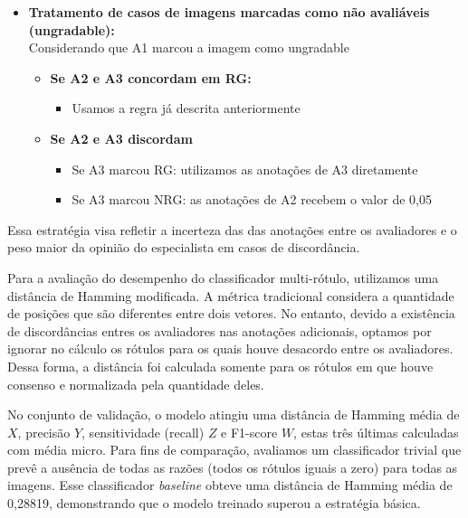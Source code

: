 \documentclass[12pt]{article}
\begin{document}
\begin{itemize}[noitemsep]
    \item \textbf{Tratamento de casos de imagens marcadas como não avaliáveis (ungradable):}\\
    Considerando que A1 marcou a imagem como ungradable
    \begin{itemize}[noitemsep]
        \item \textbf{Se A2 e A3 concordam em RG:}
        \begin{itemize}[noitemsep]
            \item Usamos a regra já descrita anteriormente
        \end{itemize}
        
        \item \textbf{Se A2 e A3 discordam}
        \begin{itemize}[noitemsep]
            \item Se A3 marcou RG: utilizamos as anotações de A3 diretamente
            \item Se A3 marcou NRG: as anotações de A2 recebem o valor de 0,05
        \end{itemize}
    \end{itemize}
    
\end{itemize}

Essa estratégia visa refletir a incerteza das das anotações entre os avaliadores e o peso maior da opinião do especialista em casos de discordância.

Para a avaliação do desempenho do classificador multi-rótulo, utilizamos uma distância de Hamming modificada. A métrica tradicional considera a quantidade de posições que são diferentes entre dois vetores. No entanto, devido a existência de discordâncias entres os avaliadores nas anotações adicionais, optamos por ignorar no cálculo os rótulos para os quais houve desacordo entre os avaliadores. Dessa forma, a distância foi calculada somente para os rótulos em que houve consenso e normalizada pela quantidade deles. 


No conjunto de validação, o modelo atingiu uma distância de Hamming média de $X$, precisão $Y$, sensitividade (recall) $Z$ e F1-score $W$, estas três últimas calculadas com média micro. Para fins de comparação, avaliamos um classificador trivial que prevê a ausência de todas as razões (todos os rótulos iguais a zero) para todas as imagens. Esse classificador \textit{baseline} obteve uma distância de Hamming média de 0,28819, demonstrando que o modelo treinado superou a estratégia básica.
\end{document}
